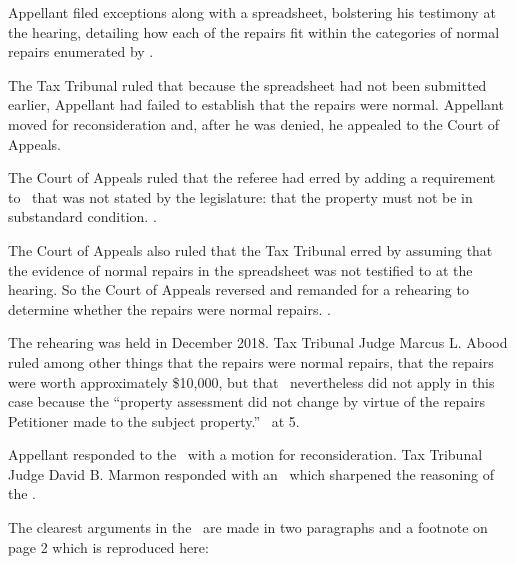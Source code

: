 \documentclass[12pt,\documentclassflag]{michiganCourtOfAppealsBrief}
\begin{document}
Appellant filed exceptions along with a spreadsheet, bolstering his testimony at the hearing, detailing how each of the repairs fit within the categories of normal repairs enumerated by \mathieuGast. 

The Tax Tribunal ruled that because the spreadsheet had not been submitted earlier, Appellant had failed to establish that the repairs were normal. Appellant moved for reconsideration and, after he was denied, he appealed to the Court of Appeals.

The Court of Appeals ruled that the referee had erred by adding a requirement to \mathieuGast\ that was not stated by the legislature: that the property must not be in substandard condition. .
 
The Court of Appeals also ruled that the Tax Tribunal erred by assuming that the evidence of normal repairs in the spreadsheet was not testified to at the hearing. So the Court of Appeals reversed and remanded for a rehearing to determine whether the repairs were normal repairs. .

The rehearing was held in December 2018. Tax Tribunal Judge Marcus L. Abood ruled among other things that the repairs were normal repairs, that the repairs were worth approximately \$10,000, but that \mathieuGast\ nevertheless did not apply in this case because the ``property assessment did not change by virtue of the repairs Petitioner made to the subject property.'' \FOJ\ at 5.

Appellant responded to the \FOJ\ with a motion for reconsideration. Tax Tribunal Judge David B. Marmon responded with an \orderDenying\ which sharpened the reasoning of the \FOJ. 

The clearest arguments in the \orderDenying\ are made in two paragraphs and a footnote on page 2 which is reproduced here:
\end{document}
